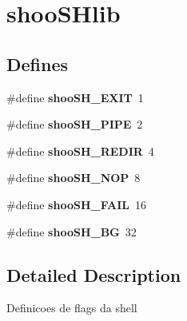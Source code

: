 \hypertarget{group__shooSHlib}{
\section{shooSHlib}
\label{group__shooSHlib}
}
\subsection*{Defines}
\begin{DoxyCompactItemize}
\item 
\hypertarget{group__shooSHlib_gaa5d65f0b82bb623179d8d08334389ac7}{
\#define {\bfseries shooSH\_\-EXIT}~1}
\label{group__shooSHlib_gaa5d65f0b82bb623179d8d08334389ac7}

\item 
\hypertarget{group__shooSHlib_ga3e1cd1337ffbf4175991d2b78349ea57}{
\#define {\bfseries shooSH\_\-PIPE}~2}
\label{group__shooSHlib_ga3e1cd1337ffbf4175991d2b78349ea57}

\item 
\hypertarget{group__shooSHlib_ga10882b2b9dd9cf9f9d5369a841b4f33b}{
\#define {\bfseries shooSH\_\-REDIR}~4}
\label{group__shooSHlib_ga10882b2b9dd9cf9f9d5369a841b4f33b}

\item 
\hypertarget{group__shooSHlib_ga95a0f16529649dae9a186a7cb145d1c5}{
\#define {\bfseries shooSH\_\-NOP}~8}
\label{group__shooSHlib_ga95a0f16529649dae9a186a7cb145d1c5}

\item 
\hypertarget{group__shooSHlib_ga924aec35b41a401249cb638c4f12329f}{
\#define {\bfseries shooSH\_\-FAIL}~16}
\label{group__shooSHlib_ga924aec35b41a401249cb638c4f12329f}

\item 
\hypertarget{group__shooSHlib_ga87432f4e3e2e2dce3b03fd0f8b9743e3}{
\#define {\bfseries shooSH\_\-BG}~32}
\label{group__shooSHlib_ga87432f4e3e2e2dce3b03fd0f8b9743e3}

\end{DoxyCompactItemize}


\subsection{Detailed Description}
Definicoes de flags da shell 